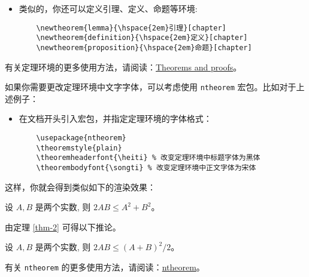\begin{itemize}
  \item 类似的，你还可以定义引理、定义、命题等环境:
        \begin{verbatim}
    \newtheorem{lemma}{\hspace{2em}引理}[chapter]
    \newtheorem{definition}{\hspace{2em}定义}[chapter]
    \newtheorem{proposition}{\hspace{2em}命题}[chapter]
  \end{verbatim}
\end{itemize}

有关定理环境的更多使用方法，请阅读：\href{https://www.overleaf.com/learn/latex/Theorems_and_proofs}{Theorems and proofs}。

如果你需要更改定理环境中文字字体，可以考虑使用 \texttt{ntheorem} 宏包。比如对于上述例子：

\begin{itemize}
  \item 在文档开头引入宏包，并指定定理环境的字体格式：
        \begin{verbatim}
    \usepackage{ntheorem}
    \theoremstyle{plain}
    \theoremheaderfont{\heiti} % 改变定理环境中标题字体为黑体
    \theorembodyfont{\songti} % 改变定理环境中正文字体为宋体
  \end{verbatim}
\end{itemize}

这样，你就会得到类似如下的渲染效果：

\begin{framed}
\begin{theo}[均值不等式]
  \label{thm-2}
  设 $A,B$ 是两个实数, 则 $2AB\leq A^2+B^2$。
\end{theo}

由定理 \ref{thm-2} 可得以下推论。

\begin{coro}
  设 $A,B$ 是两个实数, 则 $2AB\leq (A+B)^2/2$。
\end{coro}
\end{framed}

有关 \texttt{ntheorem} 的更多使用方法，请阅读：\href{https://mirrors.tuna.tsinghua.edu.cn/CTAN/macros/latex/contrib/ntheorem/ntheorem.pdf}{ntheorem}。